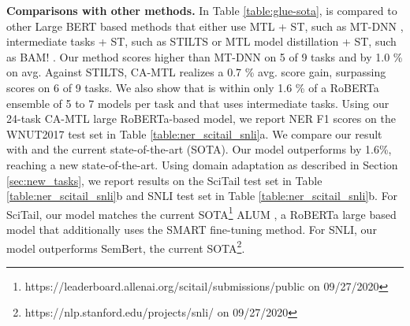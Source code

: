 \documentclass{article} \usepackage{iclr2021_conference,times}
\begin{document}
\textbf{Comparisons with other methods.} In Table \ref{table:glue-sota},  is compared to other Large BERT based methods that either use MTL + ST, such as MT-DNN \citep{mtl_bert_liu2019}, intermediate tasks + ST, such as STILTS \citep{DBLP:journals/corr/abs-1811-01088} or MTL model distillation + ST, such as BAM! \citep{mtl_bert_clark2019}. Our method scores higher than MT-DNN on 5 of 9 tasks and by 1.0 \% on avg. Against STILTS, CA-MTL realizes a 0.7 \% avg. score gain, surpassing scores on 6 of 9 tasks. We also show that  is within only 1.6 \% of a RoBERTa ensemble of 5 to 7 models per task and that uses intermediate tasks. Using our 24-task CA-MTL large RoBERTa-based model, we report NER F1 scores on the WNUT2017 test set in Table \ref{table:ner_scitail_snli}a. 
We compare our result with  and   \citep{nguyen2020bertweet} the current state-of-the-art (SOTA). Our model outperforms  by 1.6\%, reaching a new state-of-the-art. Using domain adaptation as described in Section \ref{sec:new_tasks}, we report results on the SciTail test set in Table \ref{table:ner_scitail_snli}b and SNLI test set in Table \ref{table:ner_scitail_snli}b. For SciTail, our model matches the current SOTA\footnote{https://leaderboard.allenai.org/scitail/submissions/public on 09/27/2020} ALUM \citep{liu2020adversarial}, a RoBERTa large based model that additionally uses the SMART \citep{jiang-etal-2020-smart} fine-tuning method. For SNLI, our model outperforms SemBert, the current SOTA\footnote{https://nlp.stanford.edu/projects/snli/ on 09/27/2020}. 
\end{document}
